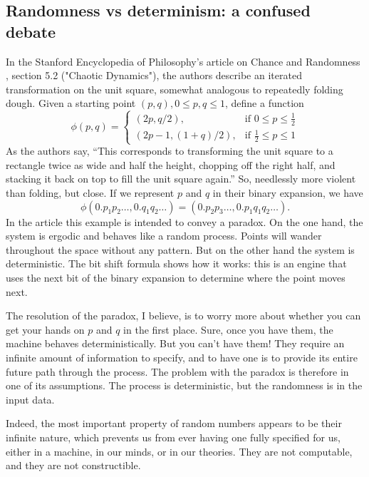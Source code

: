 \documentclass[14pt]{extarticle}
\begin{document}
\subsection{Randomness vs determinism: a confused debate}
In the Stanford Encyclopedia of Philosophy's article on Chance and Randomness \cite{sep-chance-randomness}, section 5.2 ("Chaotic Dynamics"), the authors describe an iterated transformation on the unit square, somewhat analogous to repeatedly folding dough. Given a starting point $(p,q), 0\leq p, q\leq 1$, define a function
\[
\phi(p,q) =
 \begin{cases}
 (2p, q/2), & \text{if } 0 \le p \le \frac{1}{2} \\
 (2p-1,(1+q)/2), & \text{if } \frac{1}{2} \le p \le 1
 \end{cases}
 \]
As the authors say, ``This corresponds to transforming the unit square to a rectangle twice as wide and half the height, chopping off the right half, and stacking it back on top to fill the unit square again.'' So, needlessly more violent than folding, but close. If we represent $p$ and $q$ in their binary expansion, we have \[ \phi (0.p_1 p_2\ldots, 0.q_1 q_2\ldots) = (0.p_2 p_3\ldots , 0.p_1 q_1 q_2\ldots).\]
In the article this example is intended to convey a paradox. On the one hand, the system is ergodic and behaves like a random process. Points will wander throughout the space without any pattern. But on the other hand the system is deterministic. The bit shift formula shows how it works: this is an engine that uses the next bit of the binary expansion to determine where the point moves next.

The resolution of the paradox, I believe, is to worry more about whether you can get your hands on $p$ and $q$ in the first place. Sure, once you have them, the machine behaves deterministically. But you can't have them! They require an infinite amount of information to specify, and to have one is to provide its entire future path through the process. The problem with the paradox is therefore in one of its assumptions. The process is deterministic, but the randomness is in the input data.

Indeed, the most important property of random numbers appears to be their infinite nature, which prevents us from ever having one fully specified for us, either in a machine, in our minds, or in our theories. They are not computable, and they are not constructible.
\end{document}
